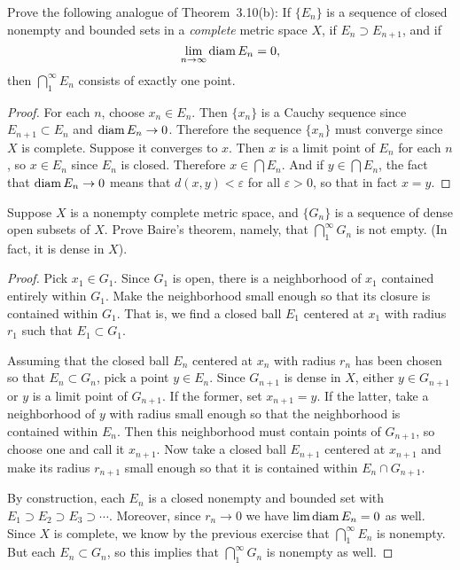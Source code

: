  Prove the following analogue of Theorem~3.10(b): If
$\{E_n\}$ is a sequence of closed nonempty and bounded sets in a {\em
  complete} metric space $X$, if $E_n\supset E_{n+1}$, and if
\begin{equation*}
  \lim_{n\to\infty}\operatorname{diam} E_n = 0,
\end{equation*}
then $\bigcap_1^\infty E_n$ consists of exactly one point.
\begin{proof}
  For each $n$, choose $x_n\in E_n$. Then $\{x_n\}$ is a Cauchy
  sequence since $E_{n+1}\subset E_n$ and $\operatorname{diam} E_n\to0$. Therefore
  the sequence $\{x_n\}$ must converge since $X$ is complete. Suppose
  it converges to $x$. Then $x$ is a limit point of $E_n$ for each
  $n$, so $x\in E_n$ since $E_n$ is closed. Therefore
  $x\in\bigcap E_n$. And if $y\in\bigcap E_n$, the fact that
  $\operatorname{diam} E_n\to0$ means that $d(x,y) < \varepsilon$ for all
  $\varepsilon > 0$, so that in fact $x = y$.
\end{proof}

 Suppose $X$ is a nonempty complete metric space, and
$\{G_n\}$ is a sequence of dense open subsets of $X$. Prove Baire's
theorem, namely, that $\bigcap_1^\infty G_n$ is not empty. (In fact,
it is dense in $X$).
\begin{proof}
  Pick $x_1\in G_1$. Since $G_1$ is open, there is a neighborhood of
  $x_1$ contained entirely within $G_1$. Make the neighborhood small
  enough so that its closure is contained within $G_1$. That is, we
  find a closed ball $E_1$ centered at $x_1$ with radius $r_1$ such that
  $E_1\subset G_1$.

  Assuming that the closed ball $E_n$ centered at $x_n$ with radius
  $r_n$ has been chosen so that $E_n\subset G_n$, pick a point
  $y\in E_n$. Since $G_{n+1}$ is dense in $X$, either $y\in G_{n+1}$
  or $y$ is a limit point of $G_{n+1}$. If the former, set
  $x_{n+1} = y$. If the latter, take a neighborhood of $y$ with radius
  small enough so that the neighborhood is contained within
  $E_n$. Then this neighborhood must contain points of $G_{n+1}$, so
  choose one and call it $x_{n+1}$. Now take a closed ball $E_{n+1}$
  centered at $x_{n+1}$ and make its radius $r_{n+1}$ small enough so
  that it is contained within $E_n\cap G_{n+1}$.

  By construction, each $E_n$ is a closed nonempty and bounded set
  with $E_1\supset E_2\supset E_3\supset\cdots$. Moreover, since
  $r_n\to0$ we have $\lim\operatorname{diam} E_n = 0$ as well. Since $X$ is
  complete, we know by the previous exercise that
  $\bigcap_1^\infty E_n$ is nonempty. But each $E_n\subset G_n$, so
  this implies that $\bigcap_1^\infty G_n$ is nonempty as well.
\end{proof}
